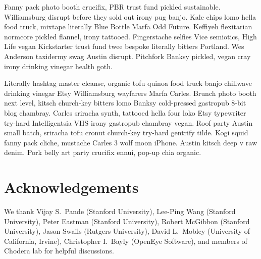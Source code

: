 \documentclass[aps,pre,twocolumn,nofootinbib,superscriptaddress,linenumbers]{revtex4-1}
\begin{document}
Fanny pack photo booth crucifix, PBR trust fund pickled sustainable. Williamsburg disrupt before they sold out irony pug banjo. Kale chips lomo hella food truck, mixtape literally Blue Bottle Marfa Odd Future. Keffiyeh flexitarian normcore pickled flannel, irony tattooed. Fingerstache selfies Vice semiotics, High Life vegan Kickstarter trust fund twee bespoke literally bitters Portland. Wes Anderson taxidermy swag Austin disrupt. Pitchfork Banksy pickled, vegan cray irony drinking vinegar health goth.

Literally hashtag master cleanse, organic tofu quinoa food truck banjo chillwave drinking vinegar Etsy Williamsburg wayfarers Marfa Carles. Brunch photo booth next level, kitsch church-key bitters lomo Banksy cold-pressed gastropub 8-bit blog chambray. Carles sriracha synth, tattooed hella four loko Etsy typewriter try-hard Intelligentsia VHS irony gastropub chambray vegan. Roof party Austin small batch, sriracha tofu cronut church-key try-hard gentrify tilde. Kogi squid fanny pack cliche, mustache Carles 3 wolf moon iPhone. Austin kitsch deep v raw denim. Pork belly art party crucifix ennui, pop-up chia organic.


\section{Acknowledgements}

We thank Vijay S.~Pande (Stanford University), Lee-Ping Wang (Stanford University), Peter Eastman (Stanford University), Robert McGibbon (Stanford University), Jason Swails (Rutgers University), David L.~Mobley (University of California, Irvine), Christopher I.~Bayly (OpenEye Software), and members of Chodera lab for helpful discussions.  



\end{document}
